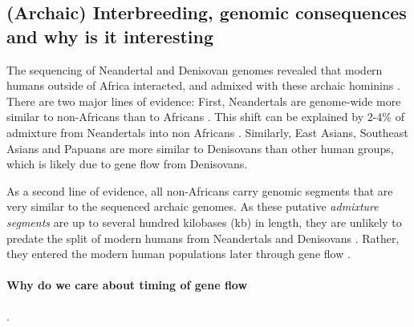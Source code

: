 \documentclass[]{article}
\let\oldparagraph\paragraph
\renewcommand{\paragraph}[1]{\oldparagraph{#1}\mbox{}}
\begin{document}
\subsection{(Archaic) Interbreeding, genomic consequences and why is it interesting}\label{(Archaic) Interbreeding, genomic consequences and why is it interesting}

The sequencing of Neandertal \citep{green_draft_2010,prufer_complete_2013,prufer_high-coverage_2017, mafessoni_high_coverage_2020} and Denisovan genomes \citep{reich_genetic_2010, meyer_high-coverage_2012} revealed that modern humans outside of Africa interacted, and admixed with these archaic hominins \citep{vernot_resurrecting_2014,fu_genome_2014,fu_early_2015,sankararaman_genomic_2014,sankararaman_combined_2016,vernot_excavating_2016,malaspinas_genomic_2016}. There are two major lines of evidence: First, Neandertals are genome-wide more similar to non-Africans than to Africans \citep{green_draft_2010, meyer_high-coverage_2012}. This shift can be explained by 2-4\% of admixture from Neandertals into non Africans \citep{green_draft_2010, prufer_complete_2013}. Similarly, East Asians, Southeast Asians and Papuans are more similar to Denisovans \citep{meyer_high-coverage_2012} than other human groups, which is likely due to gene flow from Denisovans. 

As a second line of evidence, all non-Africans carry genomic segments that are very similar to the sequenced archaic genomes. As these putative \emph{admixture segments} are up to several hundred kilobases (kb) in length, they are unlikely to predate the split of modern humans from Neandertals and Denisovans \citep{sankararaman_genomic_2014, vernot_resurrecting_2014}. Rather, they entered the modern human populations later through gene flow \citep{sankararaman_date_2012, sankararaman_combined_2016, vernot_excavating_2016, skov_detecting_2018, skov_nature_2020}. 

\paragraph{Why do we care about timing of gene flow}.
\end{document}
